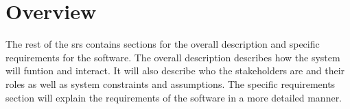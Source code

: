 \section{Overview}
The rest of the \gls{srs} contains sections for the overall description and specific requirements for the software.
The overall description describes how the system will funtion and interact.
It will also describe who the stakeholders are and their roles as well as system constraints and assumptions.
The specific requirements section will explain the requirements of the software in a more detailed manner. 




